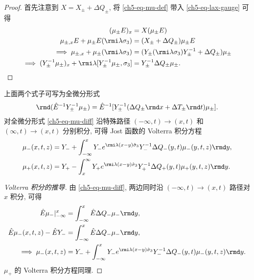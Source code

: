 \begin{proof}
    首先注意到 $ X = X_{\pm} + \Delta Q_{\pm} $, 将 \eqref{ch5-eq-mu-def} 带入 \eqref{ch5-eq-lax-gauge} 可得
    \begin{equation}
        \begin{aligned}
            (\mu_{\pm}E)_{x}                                                                         & = X (\mu_{\pm}E)                                                              \\
            \mu_{\pm, x} E + \mu_{\pm} E (\rmi \lambda \sigma_{3})                                   & = (X_{\pm} + \Delta Q_{\pm}) \mu_{\pm} E                                      \\
            \implies \mu_{\pm, x} + \mu_{\pm} (\rmi \lambda \sigma_{3})                              & = (Y_{\pm} (\rmi \lambda \sigma_{3}) Y_{\pm}^{-1} + \Delta Q_{\pm}) \mu_{\pm} \\
            \implies (Y_{\pm}^{-1} \mu_{\pm})_{x} + \rmi \lambda [Y_{\pm}^{-1}\mu_{\pm}, \sigma_{3}] & = Y_{\pm}^{-1} \Delta Q_{\pm} \mu_{\pm}.
        \end{aligned}
    \end{equation}
\end{proof}
上面两个式子可写为全微分形式
\begin{equation}
    \rmd (\hat{E}^{-1} Y_{\pm}^{-1} \mu_{\pm}) = \hat{E}^{-1} [Y
        _{\pm}^{-1} (\Delta Q_{\pm} \rmd x + \Delta T_{\pm} \rmd t) \mu_{\pm}]. \label{ch5-eq-mu-diff}
\end{equation}
对全微分形式 \eqref{ch5-eq-mu-diff} 沿特殊路径 $(-\infty, t) \to (x, t)  $ 和 $ (\infty, t) \to (x, t) $ 分别积分, 可得 Jost 函数的 Volterra 积分方程
\begin{align}
    \mu_{-}(x,t,z) & = Y_{-} + \int_{-\infty}^{x} Y_{-} e^{\rmi \lambda (x-y) \hat{\sigma}_{3}} Y_{-}^{-1} \Delta Q_{-}(y,t) \mu_{-}(y,t,z) \rmd y, \label{ch5-eq-volterra-minus} \\
    \mu_{+}(x,t,z) & = Y_{+} - \int_{x}^{\infty} Y_{+} e^{\rmi \lambda (x-y) \hat{\sigma}_{3}} Y_{+}^{-1} \Delta Q_{+}(y,t) \mu_{+}(y,t,z) \rmd y. \label{ch5-eq-volterra-plus}
\end{align}
\begin{proof}[Volterra 积分的推导]
    由 \eqref{ch5-eq-mu-diff}, 两边同时沿 $(-\infty, t) \to (x, t) $ 路径对 $ x $ 积分, 可得
    \begin{equation}
        \begin{aligned}
            \hat{E} \mu_{-}|^{x}_{-\infty}         & = \int_{-\infty}^{x} \hat{E} \Delta Q_{-} \mu_{-} \rmd y,                                                                      \\
            \hat{E} \mu_{-}(x,t,z) - \hat{E} Y_{-} & = \int_{-\infty}^{x} \hat{E} \Delta Q_{-} \mu_{-} \rmd y,                                                                      \\
            \implies \mu_{-}(x,t,z)                & = Y_{-} + \int_{-\infty}^{x} Y_{-} e^{\rmi \lambda (x-y) \hat{\sigma}_{3}} Y_{-}^{-1} \Delta Q_{-}(y,t) \mu_{-}(y,t,z) \rmd y.
        \end{aligned}
    \end{equation}
    $\mu_{+} $ 的 Volterra 积分方程同理.
\end{proof}
